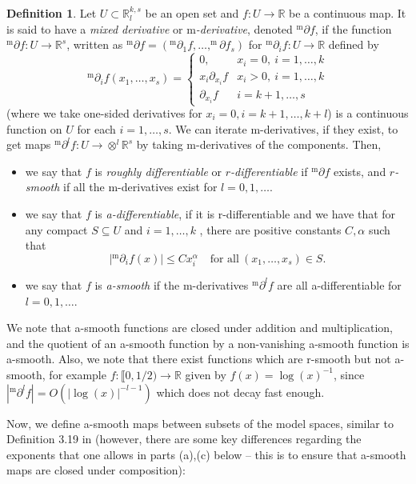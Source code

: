 \documentclass[10pt, a4paper]{article}
\theoremstyle{plain}%
\theoremstyle{definition}
\newtheorem{defn}[theorem]{Definition}
\numberwithin{figure}{section}
\numberwithin{equation}{section}
\newcommand{\bR}{\mathbb{R}}
\newcommand{\pa}{\partial}
\newcommand{\rt}{\rightarrow}
\newcommand{\m}{\mathrm{m}}
\begin{document}
\begin{defn}
	Let $U\subset \mathbb{R}^{k,s}_l$ be an open set and $f: U\rightarrow \mathbb{R}$ be a continuous map. It is said to have a \textit{mixed derivative} or \textit{$\m$-derivative}, denoted $^{\m}\partial f$, if the function $^{\m}\partial f:U\rightarrow \mathbb{R}^s$, written as $^{\m}\partial f= (^{\m}\partial_1 f,\dots ,^{\m}\partial f_s)$ for $^{\m}\partial_if : U\rightarrow\mathbb{R}$ defined by
	\[
	^{\m}\partial_i f (x_1,\dots, x_s)= \begin{cases}
		0, & x_i=0, \: i=1,\dots,k \\
		x_i\partial_{x_i}f &  x_i>0,\: i=1,\dots,k \\
		\partial_{x_i}f &  i = k+1,\dots, s
		
	\end{cases}
	\]
	(where we take one-sided derivatives for $x_i=0, i = k+1,\dots, k+l$) is a continuous function on $U$ for each $i=1,\dots, s$. We can iterate m-derivatives, if they exist, to get maps $^{\m}\pa^lf: U \rt \otimes^l\bR^s$ by taking m-derivatives of the components. Then,
	\begin{itemize}
		\item we say that $f$ is \textit{roughly differentiable} or \textit{$r$-differentiable} if $^{\m}\pa f$ exists, and \textit{$r$-smooth} if all the m-derivatives exist for $l=0,1,\dots$.
		\item we say that $f$ is \textit{a-differentiable}, if it is r-differentiable and we have that for any compact $S\subseteq U$ and $i=1,\dots, k$ , there are positive constants $C,\alpha$ such that \[
		|^{\m}\pa_if(x)| \leq Cx_i^\alpha \; \;\:\; \textrm{for all} \: (x_1,\dots,x_s)\in S.
		\]
		\item we say that $f$ is \textit{a-smooth} if the m-derivatives $^{\m}\pa ^lf$ are all a-differentiable for $l=0,1,\dots$.
	\end{itemize}	
\end{defn}

	
We note that a-smooth functions are closed under addition and multiplication, and the quotient of an a-smooth function by a non-vanishing a-smooth function is a-smooth. Also, we note that there exist functions which are r-smooth but not a-smooth, for example $f: \llbracket0,1/2) \rt \bR$ given by $f(x)= \log(x)^{-1}$, since $|^{\m}\pa ^lf| = O(|\log(x)|^{-{l-1}})$ which does not decay fast enough.


 Now, we define a-smooth maps between subsets of the model spaces, similar to Definition 3.19 in \cite{Joy16} (however, there are some key differences regarding the exponents that one allows in parts (a),(c) below -- this is to ensure that a-smooth maps are closed under composition):
\end{document}
